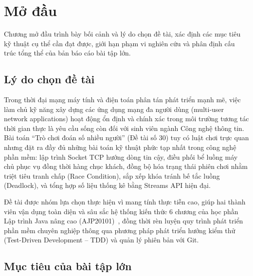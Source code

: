 \chapter{Mở đầu}
\label{ch:modau}

\begin{muctieu}
Chương mở đầu trình bày bối cảnh và lý do chọn đề tài, xác định các mục tiêu
kỹ thuật cụ thể cần đạt được, giới hạn phạm vi nghiên cứu và phân định cấu
trúc tổng thể của bản báo cáo bài tập lớn.
\end{muctieu}

\section{Lý do chọn đề tài}

Trong thời đại mạng máy tính và điện toán phân tán phát triển mạnh mẽ, việc
làm chủ kỹ năng xây dựng các ứng dụng mạng đa người dùng (multi-user network
applications) hoạt động ổn định và chính xác trong môi trường tương tác thời
gian thực là yêu cầu sống còn đối với sinh viên ngành Công nghệ thông tin. Bài
toán ``Trò chơi đoán số nhiều người'' (Đề tài số 30) tuy có luật chơi trực
quan nhưng đặt ra đầy đủ những bài toán kỹ thuật phức tạp nhất trong công nghệ
phần mềm: lập trình Socket TCP hướng dòng tin cậy, điều phối bể luồng máy chủ
phục vụ đồng thời hàng chục khách, đồng bộ hóa trạng thái phiên chơi nhằm
triệt tiêu tranh chấp (Race Condition), sắp xếp khóa tránh bế tắc luồng
(Deadlock), và tổng hợp số liệu thống kê bằng Streams API hiện đại.

Đề tài được nhóm lựa chọn thực hiện vì mang tính thực tiễn cao, giúp hai thành
viên vận dụng toàn diện và sâu sắc hệ thống kiến thức 6 chương của học phần
Lập trình Java nâng cao (AJP20101)~\cite{dophuchao2026ajp}, đồng thời rèn
luyện quy trình phát triển phần mềm chuyên nghiệp thông qua phương pháp phát
triển hướng kiểm thử (Test-Driven Development -- TDD) và quản lý phiên bản với
Git.

\section{Mục tiêu của bài tập lớn}


